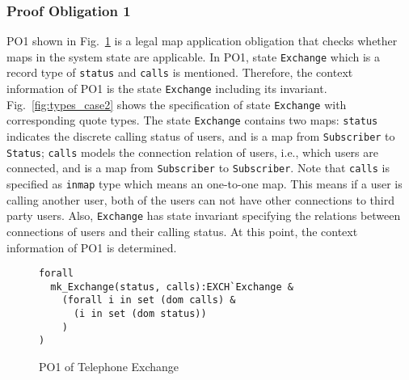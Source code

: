 \subsubsection{Proof Obligation 1}

PO1 shown in Fig.~\ref{fig:po1_case2} is a legal map application obligation that checks whether maps in the system state are applicable. In PO1, state {\tt Exchange} which is a record type of {\tt status} and {\tt calls} is mentioned. Therefore, the context information of PO1 is the state {\tt Exchange} including its invariant. Fig.~\ref{fig:types_case2} shows the specification of state {\tt Exchange} with corresponding quote types. The state {\tt Exchange} contains two maps: {\tt status} indicates the discrete calling status of users, and is a map from {\tt Subscriber} to {\tt Status}; {\tt calls} models the connection relation of users, i.e., which users are connected, and is a map from {\tt Subscriber} to {\tt Subscriber}. Note that {\tt calls} is specified as {\tt inmap} type which means an one-to-one map. This means if a user is calling another user, both of the users can not have other connections to third party users. Also, {\tt Exchange} has state invariant specifying the relations between connections of users and their calling status. At this point, the context information of PO1 is determined.

\begin{figure}[t]
\begin{center}
\begin{mdframed}[roundcorner=5pt]
\begin{Verbatim}[fontsize=\small]
forall
  mk_Exchange(status, calls):EXCH`Exchange &
    (forall i in set (dom calls) &
      (i in set (dom status))
    )
)
\end{Verbatim}
\end{mdframed}
\vspace{-10pt}
\caption{PO1 of Telephone Exchange}
\label{fig:po1_case2}
\end{center}
\vspace{-10pt}
\end{figure}


